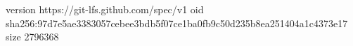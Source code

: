 version https://git-lfs.github.com/spec/v1
oid sha256:97d7e5ae3383057cebee3bdb5f07ce1ba0fb9c50d235b8ea251404a1c4373e17
size 2796368
